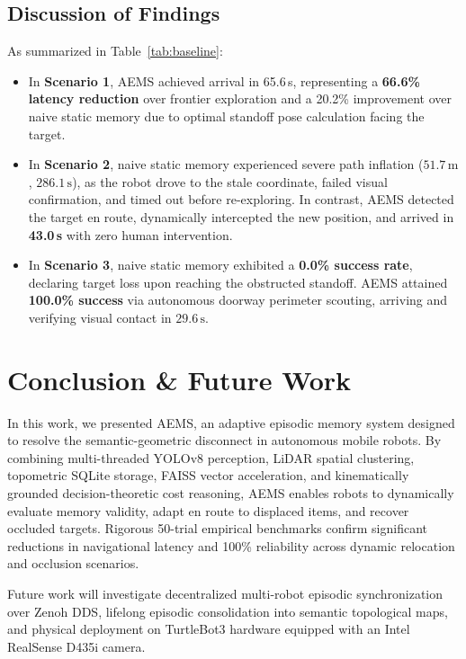 \documentclass[conference]{IEEEtran}
\begin{document}
\subsection{Discussion of Findings}
As summarized in Table~\ref{tab:baseline}:
\begin{itemize}
    \item In \textbf{Scenario 1}, AEMS achieved arrival in 65.6\,s, representing a \textbf{66.6\% latency reduction} over frontier exploration and a 20.2\% improvement over naive static memory due to optimal standoff pose calculation facing the target.
    \item In \textbf{Scenario 2}, naive static memory experienced severe path inflation ($51.7\,\text{m}$, $286.1\,\text{s}$), as the robot drove to the stale coordinate, failed visual confirmation, and timed out before re-exploring. In contrast, AEMS detected the target en route, dynamically intercepted the new position, and arrived in \textbf{43.0\,s} with zero human intervention.
    \item In \textbf{Scenario 3}, naive static memory exhibited a \textbf{0.0\% success rate}, declaring target loss upon reaching the obstructed standoff. AEMS attained \textbf{100.0\% success} via autonomous doorway perimeter scouting, arriving and verifying visual contact in $29.6\,\text{s}$.
\end{itemize}

\section{Conclusion \& Future Work}
In this work, we presented AEMS, an adaptive episodic memory system designed to resolve the semantic-geometric disconnect in autonomous mobile robots. By combining multi-threaded YOLOv8 perception, LiDAR spatial clustering, topometric SQLite storage, FAISS vector acceleration, and kinematically grounded decision-theoretic cost reasoning, AEMS enables robots to dynamically evaluate memory validity, adapt en route to displaced items, and recover occluded targets. Rigorous 50-trial empirical benchmarks confirm significant reductions in navigational latency and 100\% reliability across dynamic relocation and occlusion scenarios.

Future work will investigate decentralized multi-robot episodic synchronization over Zenoh DDS, lifelong episodic consolidation into semantic topological maps, and physical deployment on TurtleBot3 hardware equipped with an Intel RealSense D435i camera.
\end{document}
